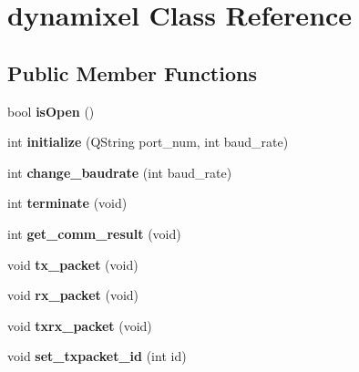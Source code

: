 \hypertarget{classdynamixel}{}\section{dynamixel Class Reference}
\label{classdynamixel}
\subsection*{Public Member Functions}
\begin{DoxyCompactItemize}
\item 
\hypertarget{classdynamixel_a5ae4b2c6eb4c91f404f973ee8e6a1914}{}bool {\bfseries is\+Open} ()\label{classdynamixel_a5ae4b2c6eb4c91f404f973ee8e6a1914}

\item 
\hypertarget{classdynamixel_a87960244d5846ae7583e37d2407eb61e}{}int {\bfseries initialize} (Q\+String port\+\_\+num, int baud\+\_\+rate)\label{classdynamixel_a87960244d5846ae7583e37d2407eb61e}

\item 
\hypertarget{classdynamixel_a7554c7889896e29e11a62027d89f3fdf}{}int {\bfseries change\+\_\+baudrate} (int baud\+\_\+rate)\label{classdynamixel_a7554c7889896e29e11a62027d89f3fdf}

\item 
\hypertarget{classdynamixel_a92ea074ed1c1a9cf29e039f8c425f01a}{}int {\bfseries terminate} (void)\label{classdynamixel_a92ea074ed1c1a9cf29e039f8c425f01a}

\item 
\hypertarget{classdynamixel_a80155fe1814322c679abef987e349939}{}int {\bfseries get\+\_\+comm\+\_\+result} (void)\label{classdynamixel_a80155fe1814322c679abef987e349939}

\item 
\hypertarget{classdynamixel_a479187cd8940c16dd4374eb5be22b888}{}void {\bfseries tx\+\_\+packet} (void)\label{classdynamixel_a479187cd8940c16dd4374eb5be22b888}

\item 
\hypertarget{classdynamixel_aa26d2d2dff768563a1cb1480aa061608}{}void {\bfseries rx\+\_\+packet} (void)\label{classdynamixel_aa26d2d2dff768563a1cb1480aa061608}

\item 
\hypertarget{classdynamixel_aebfc569c6b1eb0b98f8c385f0f921fc0}{}void {\bfseries txrx\+\_\+packet} (void)\label{classdynamixel_aebfc569c6b1eb0b98f8c385f0f921fc0}

\item 
\hypertarget{classdynamixel_a84e24c72c3e5be866f8b28c2e5bd1d95}{}void {\bfseries set\+\_\+txpacket\+\_\+id} (int id)\label{classdynamixel_a84e24c72c3e5be866f8b28c2e5bd1d95}


\end{DoxyCompactItemize}
